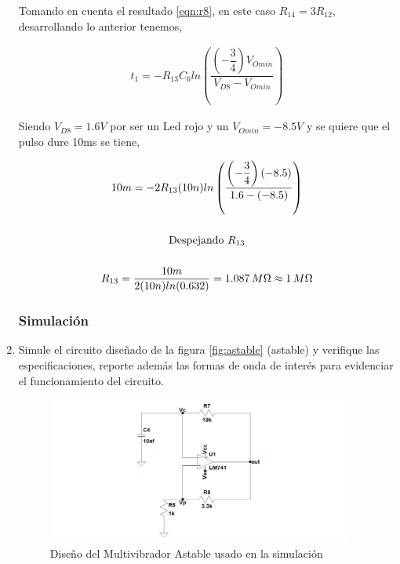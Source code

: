 \begin{enumerate}
                Tomando en cuenta el resultado \ref{eqn:r8}, en este caso $R_{14}=3R_{12}$, desarrollando lo anterior tenemos,

                \begin{gather}
                    t_1=-R_{13}C_6ln\left(\dfrac{\left(-\dfrac{3}{4}\right)V_{Omin}}{V_{D8}-V_{Omin}}\right) \nonumber
                \end{gather}
            
                Siendo $V_{D8}=1.6V$ por ser un Led rojo y un $V_{Omin}=-8.5V$ y se quiere que el pulso dure 10ms se tiene,

                \begin{gather}
                    10m=-2R_{13}(10n)ln\left(\dfrac{\left(-\dfrac{3}{4}\right)(-8.5)}{1.6-(-8.5)}\right) \nonumber\\[0.5cm]
                    \text{Despejando $R_{13}$} \nonumber\\[0.5cm]
                    R_{13}=\dfrac{10m}{2(10n)ln(0.632)}=1.087 \, M\ohm \approx 1 \, M \ohm \label{eqn:r13}
                \end{gather}


            \subsubsection{Simulación}
            
            \item Simule el circuito diseñado de la figura \ref{fig:astable} (astable) y verifique las especificaciones, reporte además las formas de onda de interés para evidenciar el funcionamiento del circuito.

                \begin{figure}[H]
                    \centering
                    \includegraphics[width=10cm]{Circuitos/sim_cir_astable.png}
                    \caption{Diseño del Multivibrador Astable usado en la simulación}
                    \label{fig:sim_cir_astable}
                \end{figure}


\end{enumerate}
